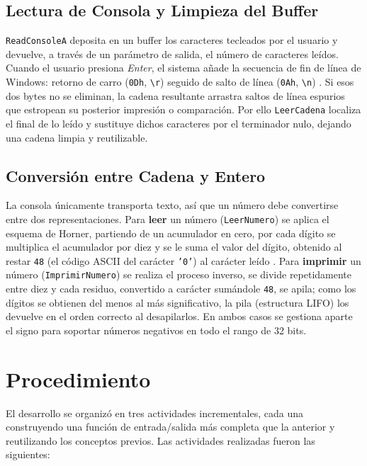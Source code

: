 \documentclass[a4paper,12pt]{article}
\begin{document}
\subsection{Lectura de Consola y Limpieza del Buffer}
\texttt{ReadConsoleA} deposita en un buffer los caracteres tecleados por el usuario y devuelve, a través de un parámetro de salida, el número de caracteres leídos. Cuando el usuario presiona \textit{Enter}, el sistema añade la secuencia de fin de línea de Windows: retorno de carro (\texttt{0Dh}, \texttt{\textbackslash r}) seguido de salto de línea (\texttt{0Ah}, \texttt{\textbackslash n}) \cite{microsoft2023consoleapi}. Si esos dos bytes no se eliminan, la cadena resultante arrastra saltos de línea espurios que estropean su posterior impresión o comparación. Por ello \texttt{LeerCadena} localiza el final de lo leído y sustituye dichos caracteres por el terminador nulo, dejando una cadena limpia y reutilizable.

\subsection{Conversión entre Cadena y Entero}
La consola únicamente transporta texto, así que un número debe convertirse entre dos representaciones. Para \textbf{leer} un número (\texttt{LeerNumero}) se aplica el esquema de Horner, partiendo de un acumulador en cero, por cada dígito se multiplica el acumulador por diez y se le suma el valor del dígito, obtenido al restar \texttt{48} (el código ASCII del carácter \texttt{'0'}) al carácter leído \cite{patterson2016computer}. Para \textbf{imprimir} un número (\texttt{ImprimirNumero}) se realiza el proceso inverso, se divide repetidamente entre diez y cada residuo, convertido a carácter sumándole \texttt{48}, se apila; como los dígitos se obtienen del menos al más significativo, la pila (estructura LIFO) los devuelve en el orden correcto al desapilarlos. En ambos casos se gestiona aparte el signo para soportar números negativos en todo el rango de 32 bits.

\section{Procedimiento}
El desarrollo se organizó en tres actividades incrementales, cada una construyendo una función de entrada/salida más completa que la anterior y reutilizando los conceptos previos. Las actividades realizadas fueron las siguientes:
\end{document}
